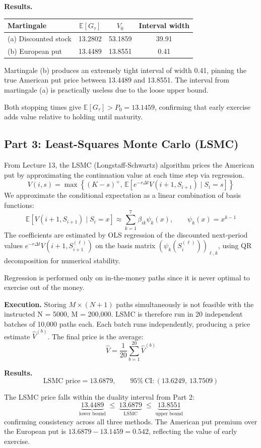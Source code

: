 \documentclass{article}
\begin{document}
\textbf{Results.}

\begin{center}
\begin{tabular}{lccc}
Martingale & $\mathbb{E}[G_\tau]$ & $V_0$ & Interval width \\
\midrule
(a) Discounted stock & 13.2802 & 53.1859 & 39.91 \\
(b) European put     & 13.4489 & 13.8551 & 0.41  \\
\bottomrule
\end{tabular}
\end{center}

Martingale (b) produces an extremely tight interval of width 0.41, pinning the true American put price between 13.4489 and 13.8551. The interval from martingale (a) is practically useless due to the loose upper bound.

Both stopping times give $\mathbb{E}[G_\tau] > P_0 = 13.1459$, confirming that early exercise adds value relative to holding until maturity. 

\subsection*{Part 3: Least-Squares Monte Carlo (LSMC)}

From Lecture 13, the LSMC (Longstaff-Schwartz) algorithm prices the American put by approximating the continuation value at each time step via regression. 
\[
V(i, s) = \max\left\{(K-s)^+,\, \mathbb{E}\left[e^{-r\Delta t}V(i+1, S_{i+1}) \mid S_i = s\right]\right\}
\]
We approximate the conditional expectation as a linear combination of basis functions:
\[
\mathbb{E}[V(i+1, S_{i+1}) \mid S_i = x] \approx \sum_{k=1}^{7} \beta_{ik}\psi_k(x), \qquad \psi_k(x) = x^{k-1}
\]
The coefficients are estimated by OLS regression of the discounted next-period values $e^{-r\Delta t}V(i+1, S_{i+1}^{(\ell)})$ on the basis matrix $(\psi_k(S_i^{(\ell)}))_{\ell,k}$, using QR decomposition for numerical stability.

Regression is performed only on in-the-money paths since it is never optimal to exercise out of the money.

\textbf{Execution.} Storing $M \times (N+1)$ paths simultaneously is not feasible with the instructed N = 5000, M = 200,000. LSMC is therefore run in 20 independent batches of 10,000 paths each. Each batch runs independently, producing a price estimate $\hat{V}^{(b)}$. The final price is the average:
\[
\hat{V} = \frac{1}{20}\sum_{b=1}^{20} \hat{V}^{(b)}
\]

\textbf{Results.}
\[
\text{LSMC price} = 13.6879, \qquad 95\%\ \text{CI}: (13.6249,\ 13.7509)
\]

The LSMC price falls within the duality interval from Part 2:
\[
\underbrace{13.4489}_{\text{lower bound}} \;\leq\; \underbrace{13.6879}_{\text{LSMC}} \;\leq\; \underbrace{13.8551}_{\text{upper bound}}
\]
confirming consistency across all three methods. The American put premium over the European put is $13.6879 - 13.1459 = 0.542$, reflecting the value of early exercise.
\end{document}
